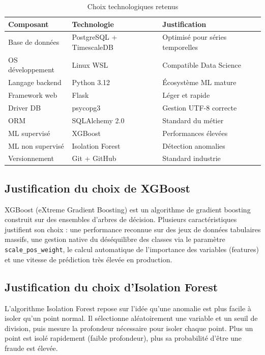 \documentclass[12pt, oneside, a4paper]{report}
\begin{document}
\begin{table}[H]
\centering
\caption{Choix technologiques retenus}
\label{tab:choix-tech}

\small
\renewcommand{\arraystretch}{1.3}
\begin{tabular}{|l|l|p{5cm}|}
\hline
\textbf{Composant} & \textbf{Technologie} & \textbf{Justification} \\
\hline
Base de données & PostgreSQL + TimescaleDB & Optimisé pour séries temporelles \\
\hline
OS développement & Linux WSL & Compatible Data Science \\
\hline
Langage backend & Python 3.12 & Écosystème ML mature \\
\hline
Framework web & Flask & Léger et rapide \\
\hline
Driver DB & psycopg3 & Gestion UTF-8 correcte \\
\hline
ORM & SQLAlchemy 2.0 & Standard du métier \\
\hline
ML supervisé & XGBoost & Performances élevées \\
\hline
ML non supervisé & Isolation Forest & Détection anomalies \\
\hline
Versionnement & Git + GitHub & Standard industrie \\
\hline
\end{tabular}
\end{table}


\subsection{Justification du choix de XGBoost}
XGBoost (eXtreme Gradient Boosting) est un algorithme de gradient boosting construit sur des ensembles d’arbres de décision. Plusieurs caractéristiques justifient son choix : une performance reconnue sur des jeux de données tabulaires massifs, une gestion native du déséquilibre des classes via le paramètre \texttt{scale\_pos\_weight}, le calcul automatique de l’importance des variables (features) et une vitesse de prédiction très élevée en production.

\subsection{Justification du choix d'Isolation Forest}
L’algorithme Isolation Forest repose sur l’idée qu’une anomalie est plus facile à isoler qu’un point normal. Il sélectionne aléatoirement une variable et un seuil de division, puis mesure la profondeur nécessaire pour isoler chaque point. Plus un point est isolé rapidement (faible profondeur), plus sa probabilité d'être une fraude est élevée.
\end{document}
